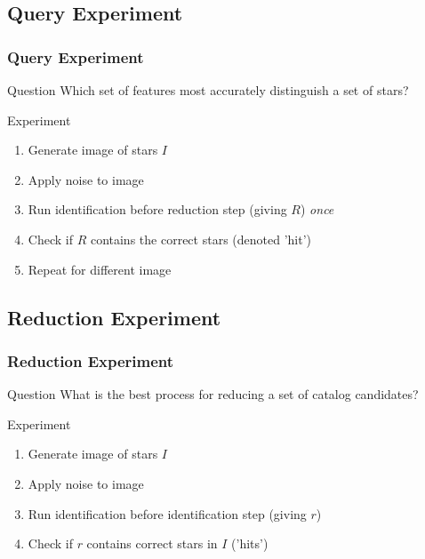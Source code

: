 \documentclass[11pt]{beamer}
\begin{document}
    \subsection{Query Experiment}\label{subsec:queryExperiment}
    \begin{frame}
        \frametitle{Query Experiment}
        \begin{block}{Question}
            Which set of features most accurately distinguish a set of stars?
        \end{block} \medskip
        \begin{block}{Experiment}
            \begin{enumerate}
                \item Generate image of stars $I$
                \item Apply noise to image
                \item Run identification before reduction step (giving $R$) \textit{once}
                \item Check if $R$ contains the correct stars (denoted 'hit')
                \item Repeat for different image
            \end{enumerate}
        \end{block}
    \end{frame}

    \subsection{Reduction Experiment}\label{subsec:reductionExperiment}
    \begin{frame}
        \frametitle{Reduction Experiment}
        \begin{block}{Question}
            What is the best process for reducing a set of catalog candidates?
        \end{block} \bigskip
        \begin{block}{Experiment}
            \begin{enumerate}
                \item Generate image of stars $I$
                \item Apply noise to image
                \item Run identification before identification step (giving $r$)
                \item Check if $r$ contains correct stars in $I$ ('hits')
            \end{enumerate}
        \end{block}
    \end{frame}
\end{document}
